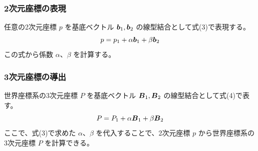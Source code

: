 \documentclass[]{jarticle}          %
\begin{document}
\subsubsection{2次元座標の表現}
任意の2次元座標 $p$ を基底ベクトル $\mbox{\boldmath $b$}_1, \mbox{\boldmath $b$}_2$ の線型結合として式(3)で表現する。
\begin{equation}
  p = p_1 + \alpha{\mbox{\boldmath $b$}_1} + \beta{\mbox{\boldmath $b$}_2}
\end{equation}
この式から係数 $\alpha$、$\beta$ を計算する。
\subsubsection{3次元座標の導出}
世界座標系の3次元座標 $P$ を基底ベクトル $\mbox{\boldmath $B$}_1, \mbox{\boldmath $B$}_2$ の線型結合として式(4)で表す。
\begin{equation}
  P= P_1 + \alpha{\mbox{\boldmath $B$}_1} + \beta{\mbox{\boldmath $B$}_2}
\end{equation}
ここで、式(3)で求めた $\alpha$、$\beta$ を代入することで、2次元座標 $p$ から世界座標系の3次元座標 $P$ を計算できる。
\end{document}

